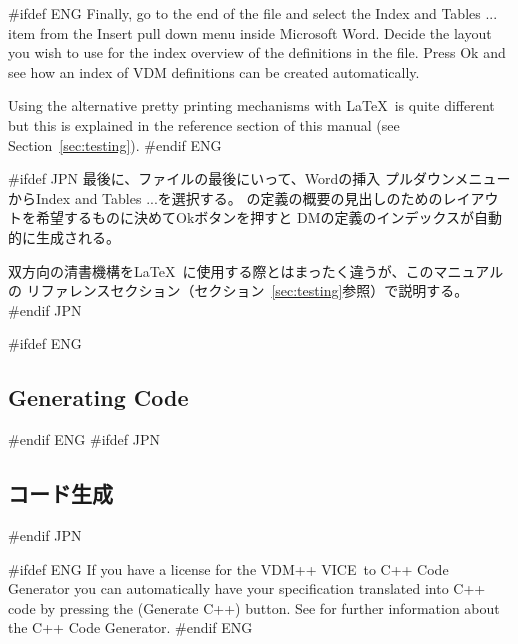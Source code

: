 \documentclass[\pformat,12pt]{article}
\newcommand{\vdmslpp}{VDM-SL}
\newcommand{\vdmslpp}{VDM++}
\renewcommand{\vdmslpp}{VDM++ VICE}
\newcommand{\guicmd}[1]{{\sf #1}}
\newcommand{\guicmd}[1]{{\gt #1}}
\begin{document}
#ifdef ENG
Finally, go to the end of the file and select the \guicmd{Index
and Tables ...} item from the \guicmd{Insert} pull down menu inside
Microsoft Word. Decide the layout you wish to use for the index
overview of the definitions in the  file. Press \guicmd{Ok} and see how
an index of VDM definitions can be created automatically.

Using the alternative pretty printing mechanisms with \LaTeX\ is quite
different but this is explained in the reference section of this
manual (see Section~\ref{sec:testing}).
#endif ENG

#ifdef JPN
最後に、ファイルの最後にいって、Wordの\guicmd{挿入} プルダウンメニューから\guicmd{Index
and Tables ...}を選択する。
の定義の概要の見出しのためのレイアウトを希望するものに決めて\guicmd{Ok}ボタンを押すと
DMの定義のインデックスが自動的に生成される。

双方向の清書機構を\LaTeX\ に使用する際とはまったく違うが、このマニュアルの
リファレンスセクション（セクション~\ref{sec:testing}参照）で説明する。
#endif JPN

#ifdef ENG
\subsection{Generating Code}
#endif ENG
#ifdef JPN
\subsection{コード生成}
#endif JPN

#ifdef ENG
If you have a license  for the \vdmslpp\ to C++
Code Generator you can automatically have your specification
translated into C++ code by pressing the 
(\guicmd{Generate C++}) button. See
 for further
information about the C++ Code Generator.
#endif ENG
\end{document}
